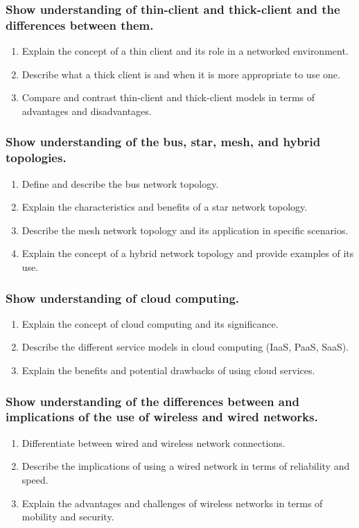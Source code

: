 \documentclass[a4paper]{article}
\begin{document}
\subsubsection{Show understanding of thin-client and thick-client and the differences between them.}
\begin{enumerate}
  \item Explain the concept of a thin client and its role in a networked environment.
  \item Describe what a thick client is and when it is more appropriate to use one.
  \item Compare and contrast thin-client and thick-client models in terms of advantages and disadvantages.
\end{enumerate}

\subsubsection{Show understanding of the bus, star, mesh, and hybrid topologies.}
\begin{enumerate}
  \item Define and describe the bus network topology.
  \item Explain the characteristics and benefits of a star network topology.
  \item Describe the mesh network topology and its application in specific scenarios.
  \item Explain the concept of a hybrid network topology and provide examples of its use.
\end{enumerate}

\subsubsection{Show understanding of cloud computing.}
\begin{enumerate}
  \item Explain the concept of cloud computing and its significance.
  \item Describe the different service models in cloud computing (IaaS, PaaS, SaaS).
  \item Explain the benefits and potential drawbacks of using cloud services.
\end{enumerate}

\subsubsection{Show understanding of the differences between and implications of the use of wireless and wired networks.}
\begin{enumerate}
  \item Differentiate between wired and wireless network connections.
  \item Describe the implications of using a wired network in terms of reliability and speed.
  \item Explain the advantages and challenges of wireless networks in terms of mobility and security.
\end{enumerate}
\end{document}
